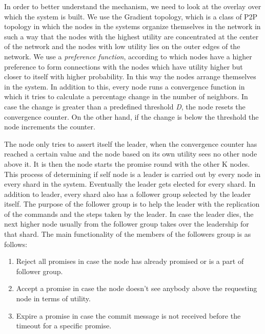 \documentclass[12pt,a4paper,twoside,openright]{book}
\begin{document}
\par In order to better understand the mechanism, we need to look at the overlay over which the system is built. We use the Gradient topology, which is a class of P2P topology in which the nodes in the systems organize themselves in the network in such a way that the nodes with the highest utility  are concentrated at the center of the network and the nodes with low utility lies on the outer edges of the network. We use a \textit{preference function}, according to which nodes have a higher preference to form connections with the nodes which have utility higher but closer to itself with higher probability. In this way the nodes arrange themselves in the system. In addition to this, every node runs a convergence function in which it tries to calculate a percentage change in the number of neighbors. In case the change is greater than a predefined threshold \textit{D}, the node resets the convergence counter. On the other hand, if the change is below the threshold the node increments the counter. 
\par The node only tries to assert itself the leader, when the convergence counter has reached a certain value and the node based on its own utility sees no other node above it. It is then the node starts the promise round with the other K nodes. This process of determining if self node is a leader is carried out by every node in every shard in the system. Eventually the leader gets elected for every shard. In addition to leader, every shard also has a follower group selected by the leader itself. The purpose of the follower group is to help the leader with the replication of the commands and the steps taken by the leader. In case the leader dies, the next higher node usually from the follower group takes over the leadership for that shard. The main functionality of the members of the followers group is as follows:


\begin{enumerate}

\item Reject all promises in case the node has already promised or is a part of follower group.

\item Accept a promise in case the node doesn't see anybody above the requesting node in terms of utility.

\item Expire a promise in case the commit message is not received before the timeout for a specific promise.

\end{enumerate}
\end{document}
